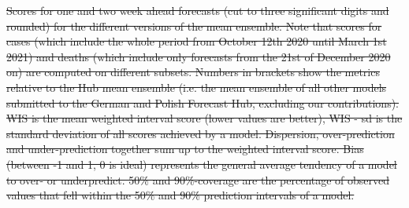 \documentclass[10pt,letterpaper]{article}
\providecommand{\DIFdeltex}[1]{{\protect\color{red}\sout{#1}}}                      %
\providecommand{\DIFdelFL}[1]{\DIFdel{#1}} %
\providecommand{\DIFdel}[1]{\texorpdfstring{\DIFdeltex{#1}}{}} %
\begin{document}

{%
\DIFdelFL{Scores for one and two week ahead forecasts (cut to three significant digits and rounded) for the different versions of the mean ensemble. Note that scores for cases (which include the whole period from October 12th 2020 until March 1st 2021) and deaths (which include only forecasts from the 21st of December 2020 on) are computed on different subsets. Numbers in brackets show the metrics relative to the Hub mean ensemble (i.e. the mean ensemble of all other models submitted to the German and Polish Forecast Hub, excluding our contributions). WIS is the mean weighted interval score (lower values are better), WIS - sd is the standard deviation of all scores achieved by a model. Dispersion, over-prediction and under-prediction together sum up to the weighted interval score. Bias (between -1 and 1, 0 is ideal) represents the general average tendency of a model to over- or underpredict. 50\% and 90\%-coverage are the percentage of observed values that fell within the 50\% and 90\% prediction intervals of a model.}%
\DIFdelFL{\hspace{\textwidth}}}
\end{document}
